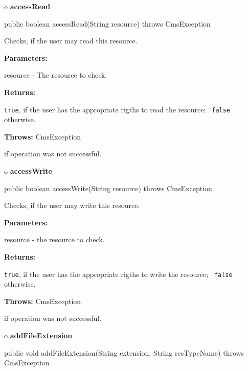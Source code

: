 o {\bf accessRead} 

\begin{PRE}
 public boolean accessRead(String resource) throws CmsException
\end{PRE}

\begin{description}
\htmlDD Checks, if the user may read this resource. 

\begin{description}
\item {\bf Parameters:}  

resource - The resource to check.  
\item {\bf Returns:}  

{\tt true}, if the user has the appropriate rigths to read the resource; {\tt
false} otherwise.  
\item {\bf Throws:} CmsException  

if operation was not successful.  
\end{description}

\end{description}

o {\bf accessWrite} 

\begin{PRE}
 public boolean accessWrite(String resource) throws CmsException
\end{PRE}

\begin{description}
\htmlDD Checks, if the user may write this resource. 

\begin{description}
\item {\bf Parameters:}  

resource - the resource to check.  
\item {\bf Returns:}  

{\tt true}, if the user has the appropriate rigths to write the resource; {\tt
false} otherwise.  
\item {\bf Throws:} CmsException  

if operation was not successful.  
\end{description}

\end{description}

o {\bf addFileExtension} 

\begin{PRE}
 public void addFileExtension(String extension,
                              String resTypeName) throws CmsException
\end{PRE}


